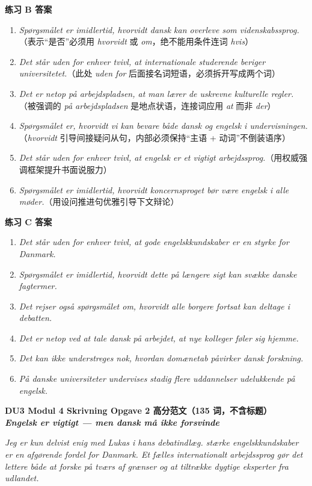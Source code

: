 \begin{answerbox}
\textbf{练习 B 答案}
\begin{enumerate}
  \item \textit{Spørgsmålet er imidlertid, hvorvidt dansk kan overleve som videnskabssprog.}（表示“是否”必须用 \textit{hvorvidt} 或 \textit{om}，绝不能用条件连词 \textit{hvis}）
  \item \textit{Det står uden for enhver tvivl, at internationale studerende beriger universitetet.}（此处 \textit{uden for} 后面接名词短语，必须拆开写成两个词）
  \item \textit{Det er netop på arbejdspladsen, at man lærer de uskrevne kulturelle regler.}（被强调的 \textit{på arbejdspladsen} 是地点状语，连接词应用 \textit{at} 而非 \textit{der}）
  \item \textit{Spørgsmålet er, hvorvidt vi kan bevare både dansk og engelsk i undervisningen.}（\textit{hvorvidt} 引导间接疑问从句，内部必须保持“主语 + 动词”不倒装语序）
  \item \textit{Det står uden for enhver tvivl, at engelsk er et vigtigt arbejdssprog.}（用权威强调框架提升书面说服力）
  \item \textit{Spørgsmålet er imidlertid, hvorvidt koncernsproget bør være engelsk i alle møder.}（用设问推进句优雅引导下文辩论）
\end{enumerate}

\textbf{练习 C 答案}
\begin{enumerate}
  \item \textit{Det står uden for enhver tvivl, at gode engelskkundskaber er en styrke for Danmark.}
  \item \textit{Spørgsmålet er imidlertid, hvorvidt dette på længere sigt kan svække danske fagtermer.}
  \item \textit{Det rejser også spørgsmålet om, hvorvidt alle borgere fortsat kan deltage i debatten.}
  \item \textit{Det er netop ved at tale dansk på arbejdet, at nye kolleger føler sig hjemme.}
  \item \textit{Det kan ikke understreges nok, hvordan domænetab påvirker dansk forskning.}
  \item \textit{På danske universiteter undervises stadig flere uddannelser udelukkende på engelsk.}
\end{enumerate}

\textbf{DU3 Modul 4 Skrivning Opgave 2 高分范文（135 词，不含标题）}\\
\textit{\textbf{Engelsk er vigtigt --- men dansk må ikke forsvinde}}

\textit{Jeg er kun delvist enig med Lukas i hans debatindlæg.  stærke engelskkundskaber er en afgørende fordel for Danmark. Et fælles internationalt arbejdssprog gør det lettere både at forske på tværs af grænser og at tiltrække dygtige eksperter fra udlandet.}


\end{answerbox}
